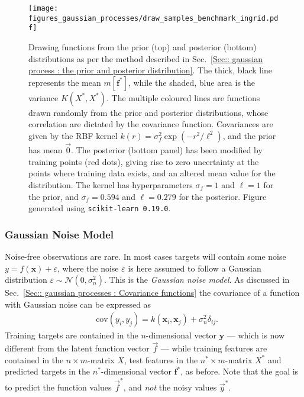 \documentclass[twoside,english]{uiofysmaster}
\begin{document}
{{\begin{figure}
\centering
\texttt{[image: figures\_gaussian\_processes/draw\_samples\_benchmark\_ingrid.pdf]}
\caption[Drawing samples from the Gaussian processes]{Drawing functions from the prior (top) and posterior (bottom) distributions as per the method described in Sec.~\ref{Sec:: gaussian process : the prior and posterior distribution}. The thick, black line represents the mean $m[\textbf{f}^*]$, while the shaded, blue area is the variance $K(X^*, X^*)$. The multiple coloured lines are functions drawn randomly from the prior and posterior distributions, whose correlation are dictated by the covariance function. Covariances are given by the RBF kernel $k(r) = \sigma_f^2 \exp(-r^2/\ell^2)$, and the prior has mean $\vec{0}$. The posterior (bottom panel) has been modified by training points (red dots), giving rise to zero uncertainty at the points where training data exists, and an altered mean value for the distribution. The kernel has hyperparameters $\sigma_f = 1$ and $\ell = 1$ for the prior, and $\sigma_f = 0.594$ and $\ell = 0.279$ for the posterior. Figure generated using {\tt scikit-learn 0.19.0}.}
\label{Fig:: gaussian process : prior posterior drawn samples}
\end{figure}

\subsubsection{Gaussian Noise Model}\label{Sec: gaussian process : Gaussian Noise Model}

Noise-free observations are rare. In most cases targets will contain some noise $y = f(\textbf{x}) + \varepsilon$, where the noise $\varepsilon$ is here assumed to follow a Gaussian distribution $\varepsilon \sim \mathcal{N}(0, \sigma_n^2)$. This is the \textit{Gaussian noise model}. As discussed in Sec.~\ref{Sec:: gaussian processes : Covariance functions} the covariance of a function with Gaussian noise can be expressed as
\begin{align}
&\text{cov}(y_i, y_j) = k(\textbf{x}_i, \textbf{x}_j) + \sigma_n^2 \delta_{ij}.
\end{align}
Training targets are contained in the $n$-dimensional vector $\textbf{y}$ --- which is now different from the latent function vector $\vec{f}$ --- while training features are contained in the $n \times m$-matrix $X$, test features in the $n^* \times m$-matrix $X^*$ and predicted targets in the $n^*$-dimensional vector $\textbf{f}^*$, as before. Note that the goal is to predict the function values $\vec{f}^*$, and \textit{not} the noisy values $\vec{y}^*$. 

}}
\end{document}
